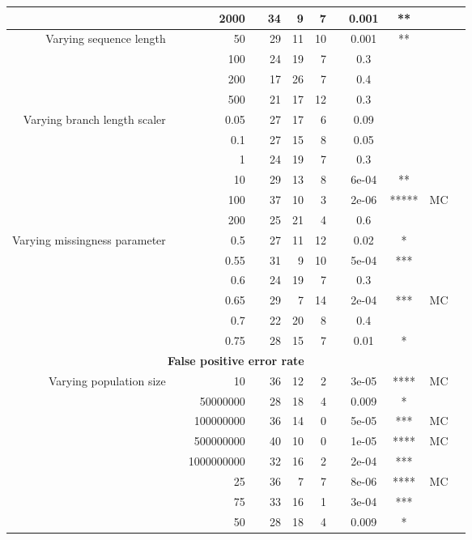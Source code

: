 \begin{table}[!h]
\begin{tabular}{r r r l r r r l c c c l}
   & & 2000 & & 34 & 9 & 7 & & 0.001 & ** &  &  \\
\midrule
\multirow{ 4}{2cm}{Varying sequence length}
   & & 50 & & 29 & 11 & 10 & & 0.001 & ** &  &  \\
   & & 100 & & 24 & 19 & 7 & & 0.3 &  &  &  \\
   & & 200 & & 17 & 26 & 7 & & 0.4 &  &  &  \\
   & & 500 & & 21 & 17 & 12 & & 0.3 &  &  &  \\
\midrule
\multirow{ 6}{2cm}{Varying branch length scaler}
   & & 0.05 & & 27 & 17 & 6 & & 0.09 &  &  &  \\
   & & 0.1 & & 27 & 15 & 8 & & 0.05 &  &  &  \\
   & & 1 & & 24 & 19 & 7 & & 0.3 &  &  &  \\
   & & 10 & & 29 & 13 & 8 & & 6e-04 & ** &  &  \\
   & & 100 & & 37 & 10 & 3 & & 2e-06 & ***** & MC &  \\
   & & 200 & & 25 & 21 & 4 & & 0.6 &  &  &  \\
\midrule
\multirow{ 6}{2cm}{Varying missingness parameter}
   & & 0.5 & & 27 & 11 & 12 & & 0.02 & * &  &  \\
   & & 0.55 & & 31 & 9 & 10 & & 5e-04 & *** &  &  \\
   & & 0.6 & & 24 & 19 & 7 & & 0.3 &  &  &  \\
   & & 0.65 & & 29 & 7 & 14 & & 2e-04 & *** & MC &  \\
   & & 0.7 & & 22 & 20 & 8 & & 0.4 &  &  &  \\
   & & 0.75 & & 28 & 15 & 7 & & 0.01 & * &  &  \\
\midrule
\multicolumn{12}{c}{\textbf{False positive error rate}} \\
\midrule
\multirow{ 6}{2cm}{Varying population size}
 & & 10 & & 36 & 12 & 2 & & 3e-05 & **** & MC &  \\
   & & 50000000 & & 28 & 18 & 4 & & 0.009 & * &  &  \\
   & & 100000000 & & 36 & 14 & 0 & & 5e-05 & *** & MC &  \\
   & & 500000000 & & 40 & 10 & 0 & & 1e-05 & **** & MC &  \\
   & & 1000000000 & & 32 & 16 & 2 & & 2e-04 & *** &  &  \\
\midrule
\multirow{ 6}{2cm}{Varying number of taxa}
   & & 25 & & 36 & 7 & 7 & & 8e-06 & **** & MC &  \\
   & & 75 & & 33 & 16 & 1 & & 3e-04 & *** &  &  \\
   & & 50 & & 28 & 18 & 4 & & 0.009 & * &  &  \\

\end{tabular}
\end{table}
